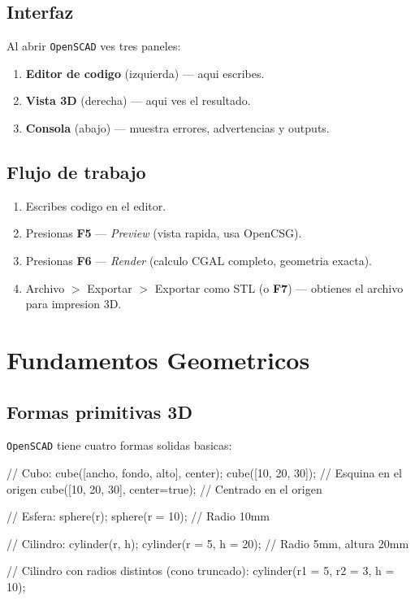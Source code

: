 \documentclass[12pt, oneside, a4paper]{report}
\newcommand{\openscadlogo}{\texttt{OpenSCAD}}
\begin{document}
\section*{Interfaz}
Al abrir \openscadlogo{} ves tres paneles:
\begin{enumerate}
    \item \textbf{Editor de codigo} (izquierda) --- aqui escribes.
    \item \textbf{Vista 3D} (derecha) --- aqui ves el resultado.
    \item \textbf{Consola} (abajo) --- muestra errores, advertencias y outputs.
\end{enumerate}

\section*{Flujo de trabajo}
\begin{enumerate}
    \item Escribes codigo en el editor.
    \item Presionas \textbf{F5} --- \textit{Preview} (vista rapida, usa OpenCSG).
    \item Presionas \textbf{F6} --- \textit{Render} (calculo CGAL completo, geometria exacta).
    \item Archivo $>$ Exportar $>$ Exportar como STL (o \textbf{F7}) --- obtienes el archivo para impresion 3D.
\end{enumerate}

\chapter{Fundamentos Geometricos}

\section{Formas primitivas 3D}
\openscadlogo{} tiene cuatro formas solidas basicas:

\begin{openscad}
// Cubo: cube([ancho, fondo, alto], center);
cube([10, 20, 30]);                    // Esquina en el origen
cube([10, 20, 30], center=true);       // Centrado en el origen

// Esfera: sphere(r);
sphere(r = 10);                        // Radio 10mm

// Cilindro: cylinder(r, h);
cylinder(r = 5, h = 20);               // Radio 5mm, altura 20mm

// Cilindro con radios distintos (cono truncado):
cylinder(r1 = 5, r2 = 3, h = 10);
\end{openscad}
\end{document}
